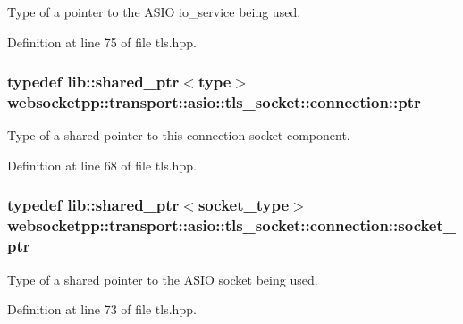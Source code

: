 Type of a pointer to the A\+S\+I\+O io\+\_\+service being used. 



Definition at line 75 of file tls.\+hpp.

\hypertarget{classwebsocketpp_1_1transport_1_1asio_1_1tls__socket_1_1connection_a2aa605c27a476eba644e062dc5bc4f6d}{}
\subsubsection[{ptr}]{\setlength{\rightskip}{0pt plus 5cm}typedef lib\+::shared\+\_\+ptr$<${\bf type}$>$ {\bf websocketpp\+::transport\+::asio\+::tls\+\_\+socket\+::connection\+::ptr}}\label{classwebsocketpp_1_1transport_1_1asio_1_1tls__socket_1_1connection_a2aa605c27a476eba644e062dc5bc4f6d}


Type of a shared pointer to this connection socket component. 



Definition at line 68 of file tls.\+hpp.

\hypertarget{classwebsocketpp_1_1transport_1_1asio_1_1tls__socket_1_1connection_a340a92078a69e44d79996c7d2f9f7aa2}{}
\subsubsection[{socket\+\_\+ptr}]{\setlength{\rightskip}{0pt plus 5cm}typedef lib\+::shared\+\_\+ptr$<${\bf socket\+\_\+type}$>$ {\bf websocketpp\+::transport\+::asio\+::tls\+\_\+socket\+::connection\+::socket\+\_\+ptr}}\label{classwebsocketpp_1_1transport_1_1asio_1_1tls__socket_1_1connection_a340a92078a69e44d79996c7d2f9f7aa2}


Type of a shared pointer to the A\+S\+I\+O socket being used. 



Definition at line 73 of file tls.\+hpp.

